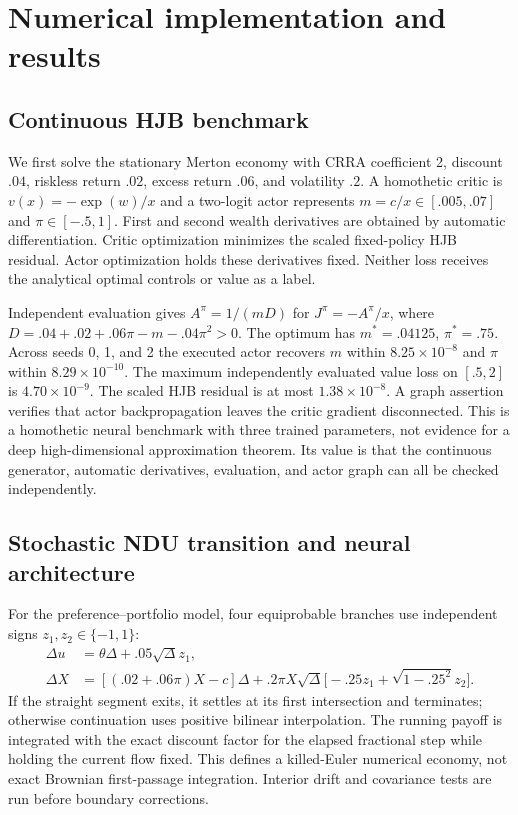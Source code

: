 \section{Numerical implementation and results}
\label{sec:results}
\subsection{Continuous HJB benchmark}
We first solve the stationary Merton economy with CRRA coefficient 2, discount $.04$, riskless return $.02$, excess return $.06$, and volatility $.2$. A homothetic critic is $v(x)=-\exp(w)/x$ and a two-logit actor represents $m=c/x\in[.005,.07]$ and $\pi\in[-.5,1]$. First and second wealth derivatives are obtained by automatic differentiation. Critic optimization minimizes the scaled fixed-policy HJB residual. Actor optimization holds these derivatives fixed. Neither loss receives the analytical optimal controls or value as a label.

Independent evaluation gives $A^\pi=1/(mD)$ for $J^\pi=-A^\pi/x$, where
$D=.04+.02+.06\pi-m-.04\pi^2>0$. The optimum has $m^*=.04125$, $\pi^*=.75$. Across seeds 0, 1, and 2 the executed actor recovers $m$ within $8.25\times10^{-8}$ and $\pi$ within $8.29\times10^{-10}$. The maximum independently evaluated value loss on $[.5,2]$ is $4.70\times10^{-9}$. The scaled HJB residual is at most $1.38\times10^{-8}$. A graph assertion verifies that actor backpropagation leaves the critic gradient disconnected. This is a homothetic neural benchmark with three trained parameters, not evidence for a deep high-dimensional approximation theorem. Its value is that the continuous generator, automatic derivatives, evaluation, and actor graph can all be checked independently.

\subsection{Stochastic NDU transition and neural architecture}
For the preference--portfolio model, four equiprobable branches use independent signs $z_1,z_2\in\{-1,1\}$:
\begin{align}
\Delta u&=\theta\Delta+.05\sqrt\Delta z_1,\\
\Delta X&=[(.02+.06\pi)X-c]\Delta
+.2\pi X\sqrt\Delta\bigl[-.25z_1+\sqrt{1-.25^2}z_2\bigr].
\label{eq:quadrature}
\end{align}
If the straight segment exits, it settles at its first intersection and terminates; otherwise continuation uses positive bilinear interpolation. The running payoff is integrated with the exact discount factor for the elapsed fractional step while holding the current flow fixed. This defines a killed-Euler numerical economy, not exact Brownian first-passage integration. Interior drift and covariance tests are run before boundary corrections.

